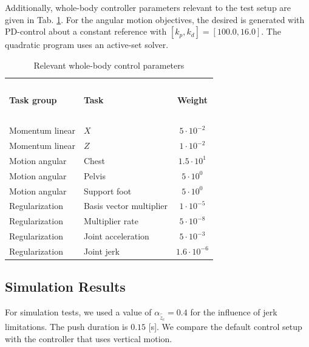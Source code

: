 \documentclass[letterpaper, 10 pt, conference]{ieeeconf}  %
\begin{document}
Additionally, whole-body controller parameters relevant to the test setup are given in Tab. \ref{tab:params}. For the angular motion objectives, the desired is generated with PD-control about a constant reference with $[k_p, k_d]=[100.0,16.0]$. The quadratic program uses an active-set solver.
\begin{table}[h]
\caption{Relevant whole-body control parameters}
\label{tab:params}
\begin{center}
\begin{tabular}{llc}
\hline~\\[-2ex]
\textbf{Task group} & \textbf{Task} & \textbf{Weight}\\
\hline ~\\[-2ex]
Momentum linear& $X$ & $5 \cdot 10^{-2}$\\
Momentum linear& $Z$ & $1 \cdot 10^{-2}$\\
Motion angular& Chest &    $1.5 \cdot 10^1$\\
Motion angular& Pelvis &  $5 \cdot 10^0$\\
Motion angular& Support foot &  $5 \cdot 10^0$\\
Regularization & Basis vector multiplier&  $1 \cdot 10^{-5}$\\
Regularization & Multiplier rate & $5 \cdot 10^{-8}$\\
Regularization & Joint acceleration & $5 \cdot 10^{-3}$\\
Regularization & Joint jerk & $1.6 \cdot 10^{-6}$\\
\hline
\end{tabular}
\end{center}
\end{table}

\subsection{Simulation Results}
For simulation tests, we used a value of $\alpha_{\hat{\ddot{z}}_{c}}=0.4$ for the influence of jerk limitations. The push duration is $0.15$ [s]. We compare the default control setup with the controller that uses vertical motion. 
\end{document}
